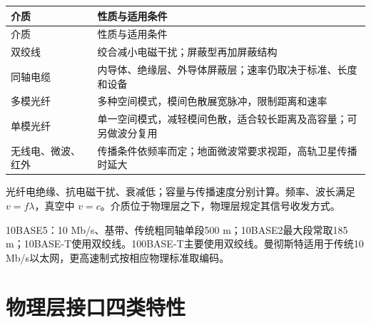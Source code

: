 \par\smallskip
\begin{wideblock}
{\fontsize{9.3}{12}\selectfont\setlength{\tabcolsep}{2.5pt}\setlength{\LTleft}{0pt}\setlength{\LTright}{0pt}
\begin{longtable}{@{}>{\raggedright\arraybackslash}p{}>{\raggedright\arraybackslash}p{}@{}}
\toprule
介质 & 性质与适用条件 \\

\midrule\endfirsthead\toprule
介质 & 性质与适用条件 \\

\midrule\endhead\bottomrule\endfoot
双绞线 & 绞合减小电磁干扰；屏蔽型再加屏蔽结构 \\

同轴电缆 & 内导体、绝缘层、外导体屏蔽层；速率仍取决于标准、长度和设备 \\

多模光纤 & 多种空间模式，模间色散展宽脉冲，限制距离和速率 \\

单模光纤 & 单一空间模式，减轻模间色散，适合较长距离及高容量；可另做波分复用 \\

无线电、微波、红外 & 传播条件依频率而定；地面微波常要求视距，高轨卫星传播时延大 \\

\end{longtable}}
\end{wideblock}
\par\smallskip

光纤电绝缘、抗电磁干扰、衰减低；容量与传播速度分别计算。频率、波长满足 \(v=f\lambda\)，真空中 \(v=c\)。介质位于物理层之下，物理层规定其信号收发方式。

10BASE5：10 Mb/s、基带、传统粗同轴单段500 m；10BASE2最大段常取185 m；10BASE-T使用双绞线。100BASE-T主要使用双绞线。曼彻斯特适用于传统10 Mb/s以太网，更高速制式按相应物理标准取编码。

\section{物理层接口四类特性}\label{CN02-interface}

